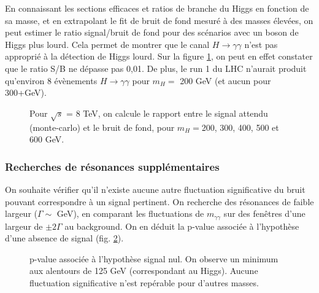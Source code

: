 \documentclass[11pt]{article} %
\begin{document}
En connaissant les sections efficaces et ratios de branche du Higgs en fonction de sa masse, et en extrapolant le fit de bruit de fond mesuré à des masses élevées, on peut estimer le ratio signal/bruit de fond pour des scénarios avec un boson de Higgs plus lourd. Cela permet de montrer que le canal $H \to \gamma \gamma$ n'est pas approprié à la détection de Higgs lourd. Sur la figure  \ref{fig:higgs_lourds_gg}, on peut en effet constater que le ratio S/B ne dépasse pas 0,01. De plus, le run 1 du LHC n'aurait produit qu'environ 8 évènements $H \to \gamma \gamma$ pour $m_H =$ 200 GeV (et aucun pour 300+GeV).
\begin{figure}[H]
\centering
  \caption{Pour $\sqrt{s}$ = 8 TeV, on calcule le rapport entre le signal attendu (monte-carlo) et le bruit de fond, pour $m_H =$200, 300, 400, 500 et 600 GeV.  }
\label{fig:higgs_lourds_gg} 
 \resizebox{.9\linewidth}{!}{}
\end{figure}

\subsubsection{Recherches de résonances supplémentaires}

On souhaite vérifier qu'il n'existe aucune autre fluctuation significative du bruit pouvant correspondre à un signal pertinent. On recherche des résonances de faible largeur ($\Gamma \sim$ GeV), en comparant les fluctuations de $m_{\gamma\gamma}$ sur des fenêtres d'une largeur de $\pm 2 \Gamma$ au background. On en déduit la p-value associée à l'hypothèse d'une absence de signal (fig. \ref{fig:pvalue}).

\begin{figure}[H]
\centering
  \caption{p-value associée à l'hypothèse signal nul. On observe un minimum aux alentours de 125 GeV (correspondant au Higgs). Aucune fluctuation significative n'est repérable pour d'autres masses.  }
\label{fig:pvalue}
 \resizebox{.9\linewidth}{!}{}
\end{figure}




\end{document}

